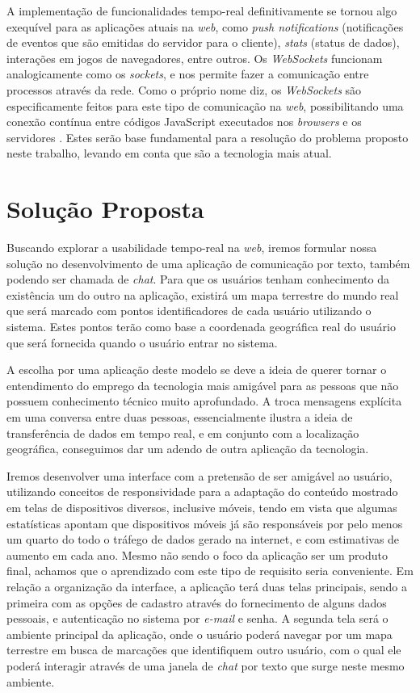 A implementação de funcionalidades tempo-real definitivamente se tornou algo exequível para as aplicações atuais na \textit{web}, como \textit{push notifications} (notificações de eventos que são emitidas do servidor para o cliente), \textit{stats} (status de dados), interações em jogos de navegadores, entre outros. Os \textit{WebSockets} funcionam analogicamente como os \textit{sockets}, e nos permite fazer a comunicação entre processos através da rede. Como o próprio nome diz, os \textit{WebSockets} são especificamente feitos para este tipo de comunicação na \textit{web}, possibilitando uma conexão contínua entre códigos JavaScript executados nos \textit{browsers} e os servidores . Estes serão base fundamental para a resolução do problema proposto neste trabalho, levando em conta que são a tecnologia mais atual.

\section{Solução Proposta}
Buscando explorar a usabilidade tempo-real na \textit{web}, iremos formular nossa solução no desenvolvimento de uma aplicação de comunicação por texto, também podendo ser chamada de \textit{chat}. Para que os usuários tenham conhecimento da existência um do outro na aplicação, existirá um mapa terrestre do mundo real que será marcado com pontos identificadores de cada usuário utilizando o sistema. Estes pontos terão como base a coordenada geográfica real do usuário que será fornecida quando o usuário entrar no sistema.

A escolha por uma aplicação deste modelo se deve a ideia de querer tornar o entendimento do emprego da tecnologia mais amigável para as pessoas que não possuem conhecimento técnico muito aprofundado. A troca mensagens explícita em uma conversa entre duas pessoas, essencialmente ilustra a ideia de transferência de dados em tempo real, e em conjunto com a localização geográfica, conseguimos dar um adendo de outra aplicação da tecnologia.

Iremos desenvolver uma interface com a pretensão de ser amigável ao usuário, utilizando conceitos de responsividade para a adaptação do conteúdo mostrado em telas de dispositivos diversos, inclusive móveis, tendo em vista que algumas estatísticas \cite{internet-traffic-stats1} apontam que dispositivos móveis já são responsáveis por pelo menos um quarto do todo o tráfego de dados gerado na internet, e com estimativas \cite{internet-traffic-stats2} \cite{internet-traffic-stats3} de aumento em cada ano. Mesmo não sendo o foco da aplicação ser um produto final, achamos que o aprendizado com este tipo de requisito seria conveniente. Em relação a organização da interface, a aplicação terá duas telas principais, sendo a primeira com as opções de cadastro através do fornecimento de alguns dados pessoais, e autenticação no sistema por \textit{e-mail} e senha. A segunda tela será o ambiente principal da aplicação, onde o usuário poderá navegar por um mapa terrestre em busca de marcações que identifiquem outro usuário, com o qual ele poderá interagir através de uma janela de \textit{chat} por texto que surge neste mesmo ambiente.

